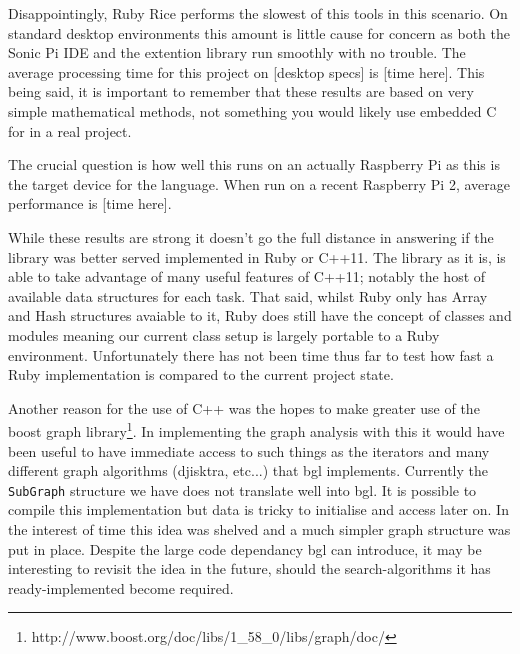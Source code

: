 \documentclass[11pt, abstracton, twoside, titlepage=true]{scrartcl}
\begin{document}
Disappointingly, Ruby Rice performs the slowest of this tools in this scenario. 
On standard desktop environments this amount is little cause for concern as both
the Sonic Pi IDE and the extention library run smoothly with no trouble. The average
processing time for this project on [desktop specs] is [time here]. This being said,
it is important to remember that these results are based on very simple mathematical 
methods, not something you would likely use embedded C for in a real project.

The crucial question is how well this runs on an actually Raspberry Pi as this is
the target device for the language. When run on a recent Raspberry Pi 2, average
performance is [time here].

While these results are strong it doesn't go the full distance in answering if the
library was better served implemented in Ruby or C++11. The library as it is, is able
to take advantage of many useful features of C++11; notably the host of available
data structures for each task. That said, whilst Ruby only has Array and Hash 
structures avaiable to it, Ruby does still have the concept of classes and modules 
meaning our current class setup is largely portable to a Ruby environment. 
Unfortunately there has not been time thus far to test how fast a Ruby implementation
is compared to the current project state.

Another reason for the use of C++ was the hopes to make greater use of the boost
graph library\footnote{http://www.boost.org/doc/libs/1\_58\_0/libs/graph/doc/}. 
In implementing the graph analysis with this it would have been useful to have
immediate access to such things as the iterators and many different graph algorithms
(djisktra, etc...) that bgl implements. Currently the \texttt{SubGraph} structure
we have does not translate well into bgl. It is possible to compile this 
implementation but data is tricky to initialise and access later on. In the interest
of time this idea was shelved and a much simpler graph structure was put in place.
Despite the large code dependancy bgl can introduce, it may be interesting to
revisit the idea in the future, should the search-algorithms it has ready-implemented
become required.



\end{document}
